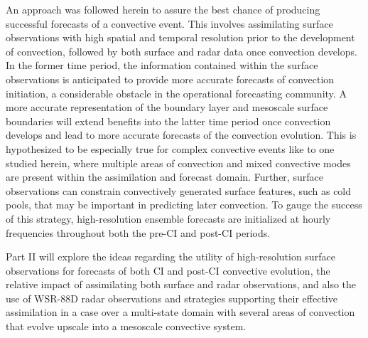 An approach was followed herein to assure the best chance of producing successful forecasts of a convective event. This involves assimilating surface observations with high spatial and temporal resolution prior to the development of convection, followed by both surface and radar data once convection develops. In the former time period, the information contained within the surface observations is anticipated to provide more accurate forecasts of convection initiation, a considerable obstacle in the operational forecasting community. A more accurate representation of the boundary layer and mesoscale surface boundaries will extend benefits into the latter time period once convection develops and lead to more accurate forecasts of the convection evolution. This is hypothesized to be especially true for complex convective events like to one studied herein, where multiple areas of convection and mixed convective modes are present within the assimilation and forecast domain. Further, surface observations can constrain convectively generated surface features, such as cold pools, that may be important in predicting later convection. To gauge the success of this strategy, high-resolution ensemble forecasts are initialized at hourly frequencies throughout both the pre-CI and post-CI periods.

Part II will explore the ideas regarding the utility of high-resolution surface observations for forecasts of both CI and post-CI convective evolution, the relative impact of assimilating both surface and radar observations, and also the use of WSR-88D radar observations and strategies supporting their effective assimilation in a case over a multi-state domain with several areas of convection that evolve upscale into a mesoscale convective system.
